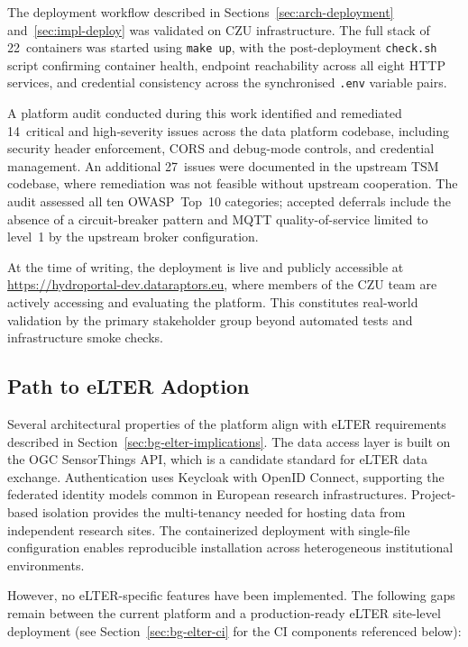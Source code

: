 The deployment workflow described in Sections~\ref{sec:arch-deployment}
and~\ref{sec:impl-deploy} was validated on CZU infrastructure. The full stack of
22~containers was started using \texttt{make up}, with the post-deployment
\texttt{check.sh} script confirming container health, endpoint reachability across
all eight HTTP services, and credential consistency across the synchronised
\texttt{.env} variable pairs.

A platform audit conducted during this work identified and remediated 14~critical and
high-severity issues across the data platform codebase, including security header
enforcement, CORS and debug-mode controls, and credential management. An additional
27~issues were documented in the upstream TSM codebase, where remediation was not
feasible without upstream cooperation. The audit assessed all ten OWASP~Top~10
categories; accepted deferrals include the absence of a circuit-breaker pattern and
MQTT quality-of-service limited to level~1 by the upstream broker configuration.

At the time of writing, the deployment is live and publicly accessible at
\url{https://hydroportal-dev.dataraptors.eu}, where members of the CZU team are
actively accessing and evaluating the platform. This constitutes real-world validation
by the primary stakeholder group beyond automated tests and infrastructure smoke checks.

\subsection{Path to eLTER Adoption}
\label{sec:test-deployment-elter}

Several architectural properties of the platform align with eLTER requirements
described in Section~\ref{sec:bg-elter-implications}. The data access layer is built on the OGC
SensorThings API, which is a candidate standard for eLTER data exchange. Authentication
uses Keycloak with OpenID Connect, supporting the federated identity models common in
European research infrastructures. Project-based isolation provides the multi-tenancy
needed for hosting data from independent research sites. The containerized deployment
with single-file configuration enables reproducible installation across heterogeneous
institutional environments.

However, no eLTER-specific features have been implemented. The following gaps remain
between the current platform and a production-ready eLTER site-level deployment
(see Section~\ref{sec:bg-elter-ci} for the CI components referenced below):

